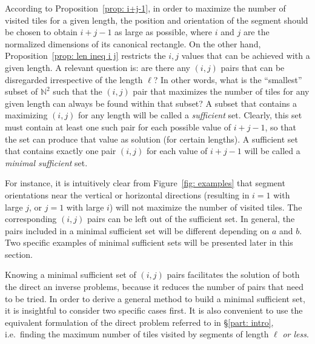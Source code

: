 \documentclass[12pt, a4paper]{article}
\newcommand{\len}{\ell} %
\begin{document}
According to Proposition~\ref{prop: i+j-1}, in order to maximize the number of visited tiles for a given length, the position and orientation of the segment should be chosen to obtain $i+j-1$ as large as possible, where $i$ and $j$ are the normalized dimensions of its canonical rectangle. On the other hand, Proposition~\ref{prop: len ineq i j} restricts the $i, j$ values that can be achieved with a given length. A relevant question is: are there any $(i,j)$ pairs that can be disregarded irrespective of the length $\len$? In other words, what is the ``smallest'' subset of $\mathbb N^2$ such that the $(i,j)$ pair that maximizes the number of tiles for any given length can always be found within that subset? A subset that contains a maximizing $(i,j)$ for any length will be called a \emph{sufficient} set. Clearly, this set must contain at least one such pair for each possible value of $i+j-1$, so that the set can produce that value as solution (for certain lengths). A sufficient set that contains exactly one pair $(i,j)$ for each value of $i+j-1$ will be called a \emph{minimal sufficient} set.

For instance, it is intuitively clear from Figure~\ref{fig: examples} that segment orientations near the vertical or horizontal directions (resulting in $i=1$ with large $j$, or $j=1$ with large $i$) will not maximize the number of visited tiles.
The corresponding $(i,j)$ pairs can be left out of the sufficient set. In general, the pairs included in a minimal sufficient set will be different depending on $a$ and $b$. Two specific examples of minimal sufficient sets will be presented later in this section.



Knowing a minimal sufficient set of $(i,j)$ pairs facilitates the solution of both the direct an inverse problems, because it reduces the number of pairs that need to be tried. In order to derive a general method to build a minimal sufficient set, it is insightful to consider two specific cases first. It is also convenient to use the equivalent formulation of the direct problem referred to in \S\ref{part: intro}, i.e.~finding the maximum number of tiles visited by segments of length $\len$ \emph{or less}.
\end{document}
